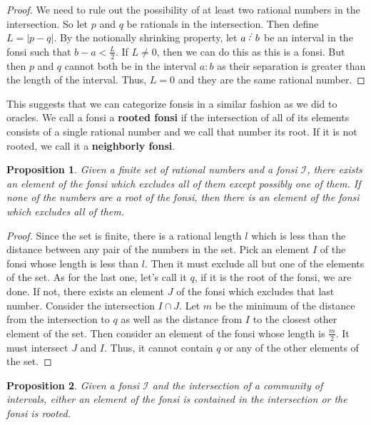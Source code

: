 \documentclass[12pt]{article}
\newtheorem{proposition}{Proposition}[subsection]
\begin{document}
\begin{proof}
    We need to rule out the possibility of at least two rational numbers in the intersection. So let $p$ and $q$ be rationals in the intersection. Then define $L = |p - q|$. By the notionally shrinking property, let $a\lte b$ be an interval in the fonsi such that $b-a < \frac{L}{2}$. If $L \neq 0$, then we can do this as this is a fonsi. But then $p$ and $q$ cannot both be in the interval $a:b$ as their separation is greater than the length of the interval. Thus, $L=0$ and they are the same rational number. 
\end{proof}

This suggests that we can categorize fonsis in a similar fashion as we did to oracles. We call a fonsi a \textbf{rooted fonsi} if the intersection of all of its elements consists of a single rational number and we call that number its root. If it is not rooted, we call it a \textbf{neighborly fonsi}. 

\begin{proposition}
    Given a finite set of rational numbers and a fonsi $\mathcal{I}$, there exists an element of the fonsi which excludes all of them except possibly one of them. If none of the numbers are a root of the fonsi, then there is an element of the fonsi which excludes all of them. 
\end{proposition}

\begin{proof}
    Since the set is finite, there is a rational length $l$ which is less than the distance between any pair of the numbers in the set. Pick an element $I$ of the fonsi whose length is less than $l$. Then it must exclude all but one of the elements of the set. As for the last one, let's call it $q$, if it is the root of the fonsi, we are done. If not, there exists an element $J$ of the fonsi which excludes that last number. Consider the intersection $I \cap J$. Let $m$ be the minimum of the distance from the intersection to $q$ as well as the distance from $I$ to the closest other element of the set. Then consider an element of the fonsi whose length is $\frac{m}{2}$. It must intersect $J$ and $I$. Thus, it cannot contain $q$ or any of the other elements of the set. 
\end{proof}


\begin{proposition}\label{pr:fonsi-contain}
    Given a fonsi $\mathcal{I}$ and the intersection of a community of intervals, either an element of the fonsi is contained in the intersection or the fonsi is rooted. 
\end{proposition}
\end{document}
